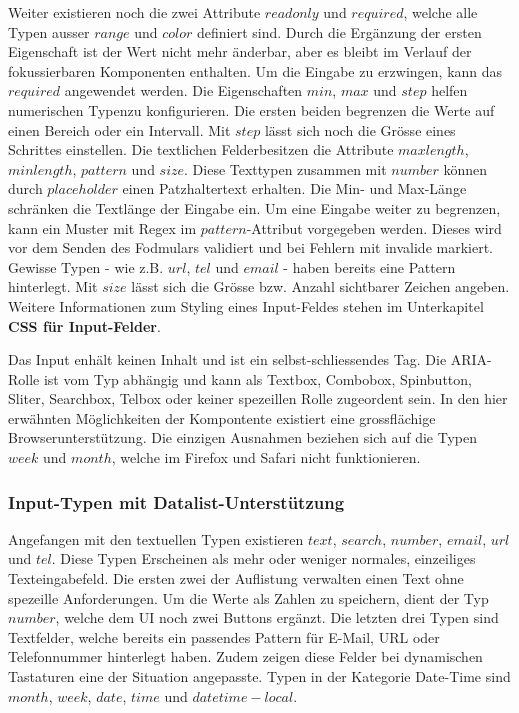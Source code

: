 Weiter existieren noch die zwei Attribute $readonly$ und $required$, welche alle Typen ausser $range$ und $color$ definiert sind.
Durch die Ergänzung der ersten Eigenschaft ist der Wert nicht mehr änderbar, aber es bleibt im Verlauf der fokussierbaren Komponenten enthalten.
Um die Eingabe zu erzwingen, kann das $required$ angewendet werden.
Die Eigenschaften $min$, $max$ und $step$ helfen numerischen Typen\footnotemark zu konfigurieren.
Die ersten beiden begrenzen die Werte auf einen Bereich oder ein Intervall.
Mit $step$ lässt sich noch die Grösse eines Schrittes einstellen.
Die textlichen Felder\footnotemark besitzen die Attribute $maxlength$, $minlength$, $pattern$ und $size$.
Diese Texttypen zusammen mit $number$ können durch $placeholder$ einen Patzhaltertext erhalten.
Die Min- und Max-Länge schränken die Textlänge der Eingabe ein.
Um eine Eingabe weiter zu begrenzen, kann ein Muster mit Regex im $pattern$-Attribut vorgegeben werden.
Dieses wird vor dem Senden des Fodmulars validiert und bei Fehlern mit invalide markiert.
Gewisse Typen - wie z.B. $url$, $tel$ und $email$ - haben bereits eine Pattern hinterlegt.
Mit $size$ lässt sich die Grösse bzw. Anzahl sichtbarer Zeichen angeben.
Weitere Informationen zum Styling eines Input-Feldes stehen im Unterkapitel \textbf{CSS für Input-Felder}.

Das Input enhält keinen Inhalt und ist ein selbst-schliessendes Tag.
Die ARIA-Rolle ist vom Typ abhängig und kann als Textbox, Combobox, Spinbutton, Sliter, Searchbox, Telbox oder keiner spezeillen Rolle zugeordent sein.
In den hier erwähnten Möglichkeiten der Kompontente existiert eine grossflächige Browserunterstützung.
Die einzigen Ausnahmen beziehen sich auf die Typen $week$ und $month$, welche im Firefox und Safari nicht funktionieren.

\subsubsection{{\color{dgray} Input-Typen mit Datalist-Unterstützung}}
Angefangen mit den textuellen Typen existieren $text$, $search$, $number$, $email$, $url$ und $tel$.
Diese Typen Erscheinen als mehr oder weniger normales, einzeiliges Texteingabefeld.
Die ersten zwei der Auflistung verwalten einen Text ohne spezeille Anforderungen. 
Um die Werte als Zahlen zu speichern, dient der Typ $number$, welche dem UI noch zwei Buttons ergänzt.
Die letzten drei Typen sind Textfelder, welche bereits ein passendes Pattern für E-Mail, URL oder Telefonnummer hinterlegt haben.
Zudem zeigen diese Felder bei dynamischen Tastaturen eine der Situation angepasste\footnotemark.
Typen in der Kategorie Date-Time sind $month$, $week$, $date$, $time$ und $datetime-local$.

